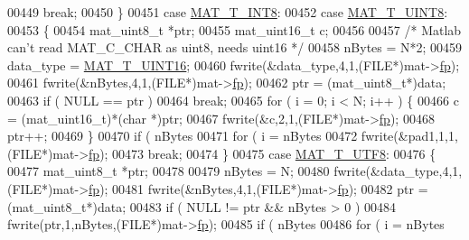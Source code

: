 \begin{DoxyCode}
{{{{00449             \textcolor{keywordflow}{break};
00450         \}
00451         \textcolor{keywordflow}{case} \hyperlink{group___m_a_t_ggacf7b3b879282b7ab3a51190e49bf3453a9807f5033ed4f9b548953742d9fd1658}{MAT\_T\_INT8}:
00452         \textcolor{keywordflow}{case} \hyperlink{group___m_a_t_ggacf7b3b879282b7ab3a51190e49bf3453a01c1bd7db68f90552862eb5d311be408}{MAT\_T\_UINT8}:
00453         \{
00454             mat\_uint8\_t *ptr;
00455             mat\_uint16\_t c;
00456 
00457             \textcolor{comment}{/* Matlab can't read MAT\_C\_CHAR as uint8, needs uint16 */}
00458             nBytes = N*2;
00459             data\_type = \hyperlink{group___m_a_t_ggacf7b3b879282b7ab3a51190e49bf3453a05bc7af7680aa68be95126ae0a4c2e31}{MAT\_T\_UINT16};
00460             fwrite(&data\_type,4,1,(FILE*)mat->\hyperlink{struct__mat__t_a85f562e407ca9ad4d2a6e14f839432b7}{fp});
00461             fwrite(&nBytes,4,1,(FILE*)mat->\hyperlink{struct__mat__t_a85f562e407ca9ad4d2a6e14f839432b7}{fp});
00462             ptr = (mat\_uint8\_t*)data;
00463             \textcolor{keywordflow}{if} ( NULL == ptr )
00464                 \textcolor{keywordflow}{break};
00465             \textcolor{keywordflow}{for} ( i = 0; i < N; i++ ) \{
00466                 c = (mat\_uint16\_t)*(\textcolor{keywordtype}{char} *)ptr;
00467                 fwrite(&c,2,1,(FILE*)mat->\hyperlink{struct__mat__t_a85f562e407ca9ad4d2a6e14f839432b7}{fp});
00468                 ptr++;
00469             \}
00470             \textcolor{keywordflow}{if} ( nBytes %
00471                 \textcolor{keywordflow}{for} ( i = nBytes %
00472                     fwrite(&pad1,1,1,(FILE*)mat->\hyperlink{struct__mat__t_a85f562e407ca9ad4d2a6e14f839432b7}{fp});
00473             \textcolor{keywordflow}{break};
00474         \}
00475         \textcolor{keywordflow}{case} \hyperlink{group___m_a_t_ggacf7b3b879282b7ab3a51190e49bf3453ac34ad81f5cbd3b7d0d95e57e5be0149b}{MAT\_T\_UTF8}:
00476         \{
00477             mat\_uint8\_t *ptr;
00478 
00479             nBytes = N;
00480             fwrite(&data\_type,4,1,(FILE*)mat->\hyperlink{struct__mat__t_a85f562e407ca9ad4d2a6e14f839432b7}{fp});
00481             fwrite(&nBytes,4,1,(FILE*)mat->\hyperlink{struct__mat__t_a85f562e407ca9ad4d2a6e14f839432b7}{fp});
00482             ptr = (mat\_uint8\_t*)data;
00483             \textcolor{keywordflow}{if} ( NULL != ptr && nBytes > 0 )
00484                 fwrite(ptr,1,nBytes,(FILE*)mat->\hyperlink{struct__mat__t_a85f562e407ca9ad4d2a6e14f839432b7}{fp});
00485             \textcolor{keywordflow}{if} ( nBytes %
00486                 \textcolor{keywordflow}{for} ( i = nBytes %
}}}}
\end{DoxyCode}
